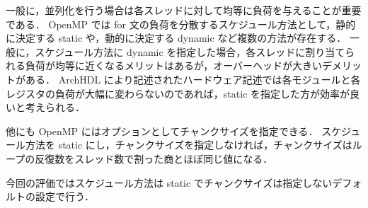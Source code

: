 一般に，並列化を行う場合は各スレッドに対して均等に負荷を与えることが重要である．
OpenMP では for 文の負荷を分散するスケジュール方法として，静的に決定する static や，動的に決定する dynamic など複数の方法が存在する．
一般に，スケジュール方法に dynamic を指定した場合，各スレッドに割り当てられる負荷が均等に近くなるメリットはあるが，オーバーヘッドが大きいデメリットがある．
ArchHDL により記述されたハードウェア記述では各モジュールと各レジスタの負荷が大幅に変わらないのであれば，static を指定した方が効率が良いと考えられる．

他にも OpenMP にはオプションとしてチャンクサイズを指定できる．
スケジュール方法を static にし，チャンクサイズを指定しなければ，チャンクサイズはループの反復数をスレッド数で割った商とほぼ同じ値になる．

今回の評価ではスケジュール方法は static でチャンクサイズは指定しないデフォルトの設定で行う．
